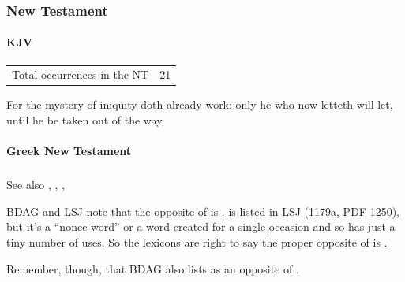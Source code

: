 		
		
	\subsubsection{New Testament} %
		\label{INIQUITY-NT}
	
		\paragraph{KJV}
			\label{INIQUITY-NT-KJV}
			
	
			\begin{tabular}{ll}
				Total occurrences in the NT & 21
			\end{tabular}
			
			\begin{compactdesc}
				\item[{\hyperref[2THESSALONIANS-2-7]{2 Thessalonians 2:7}}] For the mystery of iniquity doth already work: only he who now letteth will let, until he be taken out of the way.
			\end{compactdesc}
			
		\paragraph{Greek New Testament} %
			\label{INIQUITY-GREEK}
		
			\subparagraph{\texorpdfstring{}{}}
				\label{ANOMIA}
				
				See also \hyperref[HAMARTIA]{}, \hyperref[PARABASIS]{}, \hyperref[ADIKIA]{},
				
				BDAG and LSJ note that the opposite of  is .  is listed in LSJ (1179a, PDF 1250), but it's a ``nonce-word'' or a word created for a single occasion and so has just a tiny number of uses. So the lexicons are right to say the proper opposite of  is .
				
				Remember, though, that BDAG also lists  as an opposite of .
			
